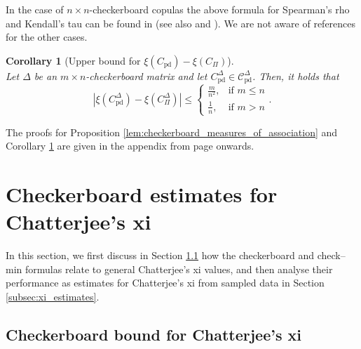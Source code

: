 \documentclass{article}
\newtheorem{corollary}[thm]{Corollary}
\theoremstyle{definition}
\newcommand{\CC}{\mathcal{C}}  %
\begin{document}
In the case of $n\times n$-checkerboard copulas the above formula for Spearman's rho and Kendall's tau can be found in \cite[Theorem 15 and 16]{durrleman2000copulas} (see also \cite[Theorem 1 and 2]{sukeda2023minimum} and \cite[Formula (2)]{kuzmenko2020checkerboard}).
We are not aware of references for the other cases.

\begin{corollary}[Upper bound for $\xi(C_{\text{pd}})-\xi(C_{\Pi})$]\label{cor:xi_checkerboard}~\\
    Let $\Delta$ be an $m\times n$-checkerboard matrix and let $C^{\Delta}_{\text{pd}}\in \CC^{\Delta}_{\text{pd}}$.
    Then, it holds that
    \[
        \left|\xi(C^{\Delta}_{\text{pd}}) - \xi(C^{\Delta}_{\Pi})\right|
        \le
        \begin{cases} 
            \frac{m}{n^2}, & \text{if } m\le n \\
            \frac{1}{n}, & \text{if } m > n
        \end{cases}
    .\]
\end{corollary}

The proofs for Proposition \ref{lem:checkerboard_measures_of_association} and Corollary \ref{cor:xi_checkerboard} are given in the appendix from page \pageref{proof:checkerboard_measures_of_association} onwards.


\section{Checkerboard estimates for Chatterjee's xi}
\label{sec:checkerboard_bounds}

In this section, we first discuss in Section \ref{subsec:xi_lower_bound} how the checkerboard and check--min formulas relate to general Chatterjee's xi values, and then analyse their performance as estimates for Chatterjee's xi from sampled data in Section \ref{subsec:xi_estimates}.

\subsection{Checkerboard bound for Chatterjee's xi}
\label{subsec:xi_lower_bound}
\end{document}
